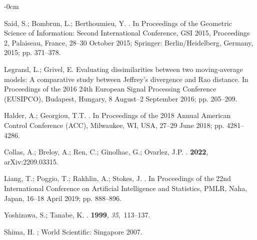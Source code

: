 \documentclass[entropy,article,accept,oneauthor,pdftex,entropy]{Definitions/mdpi}
\begin{document}
\begin{adjustwidth}{-\extralength}{0cm}
\begin{thebibliography}{999}
Said, S.; Bombrun, L.; Berthoumieu, Y.
.
\newblock In Proceedings of the Geometric Science of Information: Second
  International Conference, GSI 2015, Proceedings 2, Palaiseau, France, 28--30 October 2015;
   Springer: {Berlin/Heidelberg, Germany,} %
  2015; pp. 371--378.

Legrand, L.; Grivel, E.
\newblock Evaluating dissimilarities between two moving-average models: A
  comparative study between Jeffrey's divergence and Rao distance.
\newblock In Proceedings of the 2016 24th European Signal Processing Conference
  (EUSIPCO), {Budapest, Hungary, 8 August--2 September 2016;} pp. 205--209.

Halder, A.; Georgiou, T.T.
.
\newblock In Proceedings of the 2018 Annual American Control Conference (ACC), {Milwaukee, WI, USA, 27--29 June
2018; }pp. 4281--4286.

Collas, A.; Breloy, A.; Ren, C.; Ginolhac, G.; Ovarlez, J.P.
.
 {\bf 2022}, arXiv:2209.03315.

Liang, T.; Poggio, T.; Rakhlin, A.; Stokes, J.
.
\newblock In Proceedings of the 22nd International Conference on Artificial
  Intelligence and Statistics, PMLR, {Naha, Japan, 16--18 April 2019;} pp. 888--896.

Yoshizawa, S.; Tanabe, K.
.
 {\bf 1999}, {\em 35},~113--137.

Shima, H.
; {World Scientific: Singapore} %
 2007.


\end{thebibliography}
\end{adjustwidth}
\end{document}

